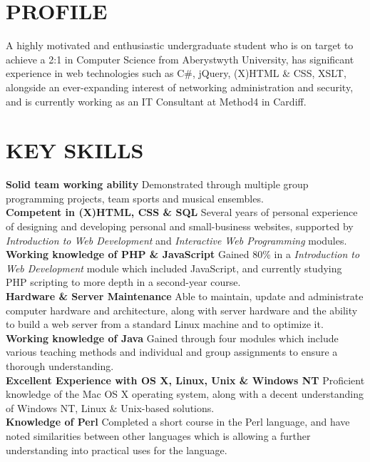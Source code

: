\documentclass[line,margin]{res}
\begin{document}
\address{61 Jim Driscoll Way, Cardiff, CF11 7JL}
\address{+44 (0) 78927 18071\\me@edparry.com\\edparry.com}

 
\begin{resume}
 
\section{PROFILE}A highly motivated and enthusiastic undergraduate student who is on target to achieve a 2:1 in Computer Science from Aberystwyth University, has significant experience in web technologies such as C\#, jQuery, (X)HTML \& CSS, XSLT, alongside an ever-expanding interest of networking administration and security, and is currently working as an IT Consultant at Method4 in Cardiff.

\section{KEY SKILLS}
{\bf Solid team working ability} Demonstrated through multiple group programming projects, team sports and musical ensembles.\\
{\bf Competent in (X)HTML, CSS \& SQL} Several years of personal experience of designing and developing personal and small-business websites, supported by {\sl Introduction to Web Development} and {\sl Interactive Web Programming} modules.\\
{\bf Working knowledge of PHP \& JavaScript} Gained 80\% in a {\sl Introduction to Web Development} module which included JavaScript, and currently studying PHP scripting to more depth in a second-year course.\\
{\bf Hardware \& Server Maintenance} Able to maintain, update and administrate computer hardware and architecture, along with server hardware and the ability to build a web server from a standard Linux machine and to optimize it.\\
{\bf Working knowledge of Java} Gained through four modules which include various teaching methods and individual and group assignments to ensure a thorough understanding.\\
{\bf Excellent Experience with OS X, Linux, Unix \& Windows NT} Proficient knowledge of the Mac OS X operating system, along with a decent understanding of Windows NT, Linux \& Unix-based solutions.\\
{\bf Knowledge of Perl} Completed a short course in the Perl language, and have noted similarities between other languages which is allowing a further understanding into practical uses for the language.
 

\end{resume}
\end{document}
